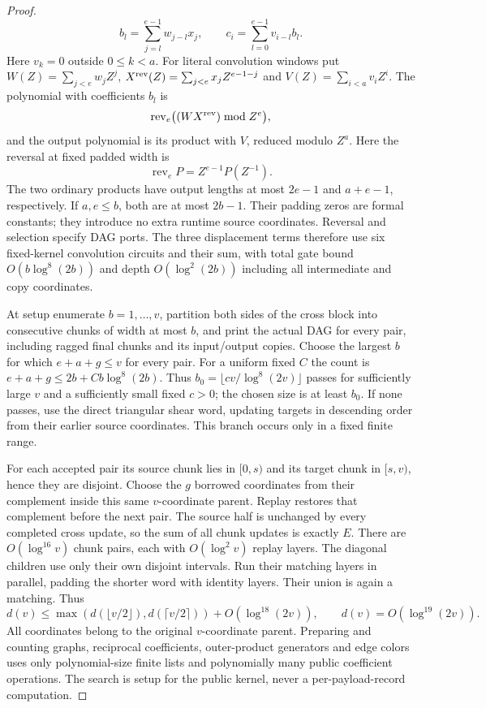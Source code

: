 \begin{proof}
\[
 b_l=\sum_{j=l}^{e-1}w_{j-l}x_j,\qquad
 c_i=\sum_{l=0}^{e-1}v_{i-l}b_l.
\]
Here $v_k=0$ outside $0\le k<a$.
For literal convolution windows put
$W(Z)=\sum_{j<e}w_jZ^j$, $X^{\rm rev}(Z)=\sum_{j<e}x_jZ^{e-1-j}$
and $V(Z)=\sum_{i<a}v_iZ^i$. The polynomial with coefficients $b_l$ is
\[
 \operatorname{rev}_e\bigl((W X^{\rm rev})\bmod Z^e\bigr),
\]
and the output polynomial is its product with $V$, reduced modulo $Z^a$.
Here the reversal at fixed padded width is
\[\operatorname{rev}_e P=Z^{e-1}P(Z^{-1}).\]
The two ordinary products have output lengths at most $2e-1$ and
$a+e-1$, respectively. If $a,e\le b$, both are at most $2b-1$.
Their padding zeros are formal constants; they introduce no extra
runtime source coordinates. Reversal and selection specify DAG ports.
The three displacement terms therefore use six fixed-kernel convolution
circuits and their sum, with total gate bound $O(b\log^8(2b))$ and
depth $O(\log^2(2b))$ including all intermediate and copy coordinates.

At setup enumerate $b=1,\ldots,v$, partition both sides of the cross
block into consecutive chunks of width at most $b$, and print the
actual DAG for every pair, including ragged final chunks and its
input/output copies. Choose the largest $b$ for which
$e+a+g\le v$ for every pair. For a uniform fixed $C$ the count is
$e+a+g\le2b+Cb\log^8(2b)$. Thus
$b_0=\lfloor c v/\log^8(2v)\rfloor$ passes for sufficiently large $v$
and a sufficiently small fixed $c>0$; the chosen size is at least $b_0$.
If none passes, use the direct triangular shear word, updating targets
in descending order from their earlier source coordinates.
This branch occurs only in a fixed finite range.

For each accepted pair its source chunk lies in $[0,s)$ and its target
chunk in $[s,v)$, hence they are disjoint. Choose the $g$ borrowed
coordinates from their complement inside this same $v$-coordinate
parent. Replay restores that complement before the next pair.
The source half is unchanged by every completed cross update, so the
sum of all chunk updates is exactly $E$.
There are
$O(\log^{16}v)$ chunk pairs, each with $O(\log^2v)$ replay layers.
The diagonal children use only their own disjoint intervals.
Run their matching layers in parallel, padding the shorter word
with identity layers. Their union is again a matching. Thus
\[
 d(v)\le\max(d(\lfloor v/2\rfloor),d(\lceil v/2\rceil))
       +O(\log^{18}(2v)),\qquad d(v)=O(\log^{19}(2v)).
\]
All coordinates belong to the original $v$-coordinate parent. Preparing
and counting graphs, reciprocal coefficients, outer-product generators
and edge colors uses only polynomial-size finite lists and polynomially
many public coefficient operations. The search is setup for the public
kernel, never a per-payload-record computation.
\end{proof}

